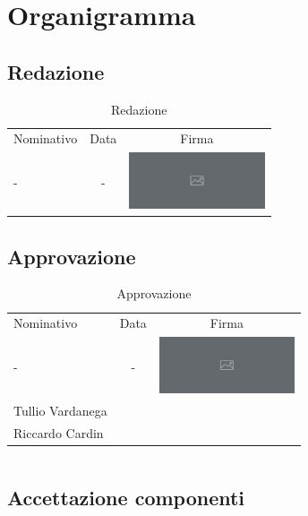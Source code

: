 \documentclass[../piano-di-progetto.tex]{subfiles}
\begin{document}
  \section{Organigramma}

  \subsection{Redazione}

  \begin{table}[H]
    \centering
    \begin{tabular}{lcc}
      Nominativo & Data & Firma \\
      - & - & \includegraphics[width=4cm]{img/ph.png}
    \end{tabular}
    \caption{Redazione}
  \end{table}

  \subsection{Approvazione}

  \begin{table}[H]
    \centering
    \begin{tabular}{lcc}
      Nominativo & Data & Firma \\
      - & - & \includegraphics[width=4cm]{img/ph.png} \\
      Tullio Vardanega & &    \\
      Riccardo Cardin & &
    \end{tabular}
    \caption{Approvazione}
  \end{table}

  
  \begin{table}[H]
    \centering
    \begin{tabular}{lcc}

    \end{tabular}
  \end{table}

  \subsection{Accettazione componenti}
\end{document}
